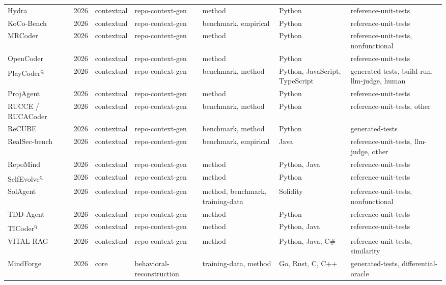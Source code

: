 {\begin{longtable}{@{}p{2.8cm}lllp{1.9cm}p{1.5cm}p{2.9cm}@{}}
Hydra~\cite{Hydra2026} & 2026 & contextual & repo-context-gen & method & Python & reference-unit-tests \\
KoCo-Bench~\cite{KoCoBench2026} & 2026 & contextual & repo-context-gen & benchmark, empirical & Python & reference-unit-tests \\
MRCoder~\cite{MRCoder2026} & 2026 & contextual & repo-context-gen & method & Python & reference-unit-tests, nonfunctional \\
OpenCoder~\cite{OpenCoder2026} & 2026 & contextual & repo-context-gen & method & Python & reference-unit-tests \\
PlayCoder\textsuperscript{q}~\cite{PlayCoder2026} & 2026 & contextual & repo-context-gen & benchmark, method & Python, JavaScript, TypeScript & generated-tests, build-run, llm-judge, human \\
ProjAgent~\cite{ProjAgent2026} & 2026 & contextual & repo-context-gen & method & Python & reference-unit-tests \\
RUCCE / RUCACoder~\cite{RUCCERUCACoder2026} & 2026 & contextual & repo-context-gen & benchmark, method & Python & reference-unit-tests, other \\
ReCUBE~\cite{ReCUBE2026} & 2026 & contextual & repo-context-gen & benchmark, method & Python & generated-tests \\
RealSec-bench~\cite{RealSecbench2026} & 2026 & contextual & repo-context-gen & benchmark, empirical & Java & reference-unit-tests, llm-judge, other \\
RepoMind~\cite{RepoMind2026} & 2026 & contextual & repo-context-gen & method & Python, Java & reference-unit-tests \\
SelfEvolve\textsuperscript{q}~\cite{SelfEvolve2026} & 2026 & contextual & repo-context-gen & method & Python & reference-unit-tests \\
SolAgent~\cite{SolAgent2026} & 2026 & contextual & repo-context-gen & method, benchmark, training-data & Solidity & reference-unit-tests, nonfunctional \\
TDD-Agent~\cite{TDDAgent2026} & 2026 & contextual & repo-context-gen & method & Python & reference-unit-tests \\
TICoder\textsuperscript{q}~\cite{TICoder2026} & 2026 & contextual & repo-context-gen & method & Python, Java & reference-unit-tests \\
VITAL-RAG~\cite{VITALRAG2026} & 2026 & contextual & repo-context-gen & method & Python, Java, C\# & reference-unit-tests, similarity \\
MindForge~\cite{MindForge2026} & 2026 & core & behavioral-reconstruction & training-data, method & Go, Rust, C, C++ & generated-tests, differential-oracle \\

\end{longtable}}
